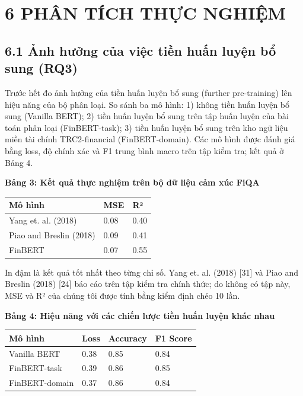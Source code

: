 \section{6 PHÂN TÍCH THỰC NGHIỆM}

\subsection{6.1 Ảnh hưởng của việc tiền huấn luyện bổ sung (RQ3)}

Trước hết đo ảnh hưởng của tiền huấn luyện bổ sung (further pre-training) lên hiệu năng của bộ phân loại. So sánh ba mô hình: 1) không tiền huấn luyện bổ sung (Vanilla BERT); 2) tiền huấn luyện bổ sung trên tập huấn luyện của bài toán phân loại (FinBERT-task); 3) tiền huấn luyện bổ sung trên kho ngữ liệu miền tài chính TRC2-financial (FinBERT-domain). Các mô hình được đánh giá bằng loss, độ chính xác và F1 trung bình macro trên tập kiểm tra; kết quả ở Bảng 4.

\textbf{Bảng 3: Kết quả thực nghiệm trên bộ dữ liệu cảm xúc FiQA}

{\small
\begin{longtable}[]{@{}lll@{}}
\toprule\noalign{}
Mô hình & MSE & R² \\
\midrule\noalign{}
\endhead
\bottomrule\noalign{}
\endlastfoot
Yang et. al. (2018) & 0.08 & 0.40 \\
Piao and Breslin (2018) & 0.09 & 0.41 \\
FinBERT & 0.07 & 0.55 \\
\end{longtable}
}

In đậm là kết quả tốt nhất theo từng chỉ số. Yang et. al. (2018) {[}31{]} và Piao and Breslin (2018) {[}24{]} báo cáo trên tập kiểm tra chính thức; do không có tập này, MSE và R² của chúng tôi được tính bằng kiểm định chéo 10 lần.

\textbf{Bảng 4: Hiệu năng với các chiến lược tiền huấn luyện khác nhau}

{\small
\begin{longtable}[]{@{}llll@{}}
\toprule\noalign{}
Mô hình & Loss & Accuracy & F1 Score \\
\midrule\noalign{}
\endhead
\bottomrule\noalign{}
\endlastfoot
Vanilla BERT & 0.38 & 0.85 & 0.84 \\
FinBERT-task & 0.39 & 0.86 & 0.85 \\
FinBERT-domain & 0.37 & 0.86 & 0.84 \\
\end{longtable}
}

